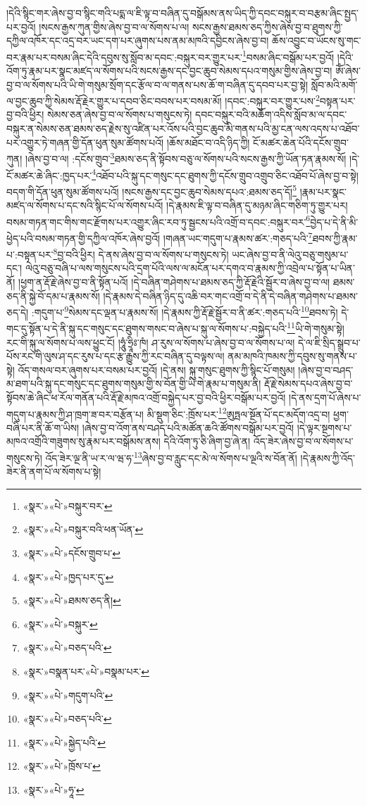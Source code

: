 །དེའི་སྙིང་གར་ཞེས་བྱ་བ་སྙིང་གའི་པདྨ་ལ་ཇི་ལྟ་བ་བཞིན་དུ་བསྒོམས་ནས་ཡིད་ཀྱི་དབང་བསྐུར་བ་བརྩམ་ཞིང་སྤྱད་པར་བྱའོ། །སངས་རྒྱས་ཀུན་གྱིས་ཞེས་བྱ་བ་ལ་སོགས་པ་ལ། སངས་རྒྱས་ཐམས་ཅད་ཀྱིས་ཞེས་བྱ་བ་ཐུགས་ཀྱི་དཀྱིལ་འཁོར་དང་འདྲ་བར་ཡང་དག་པར་ཞུགས་པས་ནམ་མཁའི་དབྱིངས་ཞེས་བྱ་བ། ཆོས་འབྱུང་བ་ཡོངས་སུ་གང་བར་རྣམ་པར་བསམ་ཞིང་དེའི་དབུས་སུ་སློབ་མ་དབང་:བསྐུར་བར་གྱུར་པར་\footnote{«སྣར་»«པེ་»བསྐུར་བར་}བསམ་ཞིང་བསྒོམ་པར་བྱའོ། །དེའི་འོག་ཏུ་རྣམ་པར་སྣང་མཛད་ལ་སོགས་པའི་སངས་རྒྱས་དང་བྱང་ཆུབ་སེམས་དཔའ་གསུམ་གྱིས་ཞེས་བྱ་བ། ཨོཾ་ཞེས་བྱ་བ་ལ་སོགས་པའི་ཡི་གེ་གསུམ་སྲོག་དང་རྩོལ་བ་ལ་གནས་པས་ཆོ་ག་བཞིན་དུ་དབབ་པར་བྱ་སྟེ། སློབ་མའི་མགོ་ལ་བྱང་ཆུབ་ཀྱི་སེམས་རྡོ་རྗེར་གྱུར་པ་དབབ་ཅིང་བབས་པར་བསམ་མོ། །དབང་:བསྐུར་བར་གྱུར་པས་\footnote{«སྣར་»«པེ་»བསྐུར་བའི་ཕན་ཡོན་}བསྟན་པར་བྱ་བའི་ཕྱིར། སེམས་ཅན་ཞེས་བྱ་བ་ལ་སོགས་པ་གསུངས་ཏེ། དབང་བསྐུར་བའི་མཆོག་འདིས་སློབ་མ་ལ་དབང་བསྐུར་ན་སེམས་ཅན་ཐམས་ཅད་རྗེས་སུ་འཛིན་པར་འོས་པའི་བྱང་ཆུབ་མི་གནས་པའི་མྱ་ངན་ལས་འདས་པ་འཐོབ་པར་འགྱུར་ཏེ་གཞན་གྱི་དོན་ཕུན་སུམ་ཚོགས་པའོ། །ཆོས་མཐོང་བ་འདི་ཉིད་ཀྱི། ངོ་མཚར་ཆེན་པོའི་དངོས་གྲུབ་ཀུན། །ཞེས་བྱ་བ་ལ། :དངོས་གྲུབ་\footnote{«སྣར་»«པེ་»དངོས་གྲུབ་པ་}ཐམས་ཅད་ནི་སྟོབས་བཅུ་ལ་སོགས་པའི་སངས་རྒྱས་ཀྱི་ཡོན་ཏན་རྣམས་སོ། །དེ་ངོ་མཚར་ཆེ་ཞིང་:ཁྱད་པར་\footnote{«སྣར་»«པེ་»ཁྱད་པར་དུ་}འཐོབ་པའི་སྐུ་དང་གསུང་དང་ཐུགས་ཀྱི་དངོས་གྲུབ་འགྲུབ་ཅིང་འཐོབ་པོ་ཞེས་བྱ་བ་སྟེ། བདག་གི་དོན་ཕུན་སུམ་ཚོགས་པའོ། །སངས་རྒྱས་དང་བྱང་ཆུབ་སེམས་དཔའ་:ཐམས་ཅད་དོ།\footnote{«སྣར་»«པེ་»ཐམས་ཅད་ནི།} །རྣམ་པར་སྣང་མཛད་ལ་སོགས་པ་དང་སའི་སྙིང་པོ་ལ་སོགས་པའོ། །དེ་རྣམས་ཇི་ལྟ་བ་བཞིན་དུ་མཉམ་ཞིང་གཅིག་ཏུ་གྱུར་པར། བསམ་གཏན་གང་གིས་གང་རྫོགས་པར་འགྱུར་ཞིང་རབ་ཏུ་སྦྱངས་པའི་འགྲོ་བ་དབང་:བསྐུར་བར་\footnote{«སྣར་»«པེ་»བསྐུར་}བྱེད་པ་དེ་ནི་མི་ཕྱེད་པའི་བསམ་གཏན་གྱི་དཀྱིལ་འཁོར་ཞེས་བྱའོ། །གཞན་ཡང་གདུག་པ་རྣམས་ཚར་:གཅད་པའི་\footnote{«སྣར་»«པེ་»བཅད་པའི་}ཐབས་ཀྱི་རྣམ་པ་:བསྟན་པར་\footnote{«སྣར་»བསྣན་པར་«པེ་»བསྣམ་པར་}བྱ་བའི་ཕྱིར། དེ་ནས་ཞེས་བྱ་བ་ལ་སོགས་པ་གསུངས་ཏེ། ཡང་ཞེས་བྱ་བ་ནི་ལེའུ་བཅུ་གསུམ་པ་དང་། ལེའུ་བཅུ་བཞི་པ་ལས་གསུངས་པའི་དྲག་པོའི་ལས་ལ་མངོན་པར་དགའ་བ་རྣམས་ཀྱི་འབྲེལ་པ་སྟོན་པ་ཡིན་ནོ། །ཕྱག་ན་རྡོ་རྗེ་ཞེས་བྱ་བ་ནི་སྟོན་པའོ། །དེ་བཞིན་གཤེགས་པ་ཐམས་ཅད་ཀྱི་རྡོ་རྗེའི་སྦྱོར་བ་ཞེས་བྱ་བ་ལ། ཐམས་ཅད་ནི་སྐྱེ་བོ་དམ་པ་རྣམས་སོ། །དེ་རྣམས་དེ་བཞིན་ཉིད་དུ་འཆི་བར་གང་འགྲོ་བ་དེ་ནི་དེ་བཞིན་གཤེགས་པ་ཐམས་ཅད་དེ། :གདུག་པ་\footnote{«སྣར་»«པེ་»གདུག་པའི་}སེམས་དང་ལྡན་པ་རྣམས་སོ། །དེ་རྣམས་ཀྱི་རྡོ་རྗེ་སྦྱོར་བ་ནི་ཚར་:གཅད་པའི་\footnote{«སྣར་»«པེ་»བཅད་པའི་}ཐབས་ཏེ། དེ་གང་དུ་སྟོན་པ་དེ་ནི་སྐུ་དང་གསུང་དང་ཐུགས་གསང་བ་ཞེས་པ་སྐུ་ལ་སོགས་པ་:བསྐྱེད་པའི་\footnote{«སྣར་»«པེ་»སྐྱེད་པའི་}ཡི་གེ་གསུམ་སྟེ། རང་གི་སྐུ་ལ་སོགས་པ་ལས་ཕྱུང་ངོ། །ཧཱུཾ་ཧྲཱིཿ་ཁཾ། ཤ་རུས་ལ་སོགས་པ་ཞེས་བྱ་བ་ལ་སོགས་པ་ལ། དེ་ལ་ཇི་སྲིད་སྒྲུབ་པ་པོས་རང་གི་ལུས་ཤ་དང་རུས་པ་དང་རྩ་རྒྱུས་ཀྱི་རང་བཞིན་དུ་བལྟས་ལ། ནམ་མཁའི་ཁམས་ཀྱི་དབུས་སུ་གནས་པ་སྟེ། འོད་གསལ་བར་ཞུགས་པར་བསམ་པར་བྱའོ། །དེ་ནས། སྐུ་གསུང་ཐུགས་ཀྱི་སྙིང་པོ་གསུམ། །ཞེས་བྱ་བ་བཤད་མ་ཐག་པའི་སྐུ་དང་གསུང་དང་ཐུགས་གསུམ་གྱི་ས་བོན་གྱི་ཡི་གེ་རྣམ་པ་གསུམ་ནི། རྡོ་རྗེ་སེམས་དཔའ་ཞེས་བྱ་བ་སྟོབས་ཆེ་ཞིང་ཕ་རོལ་གནོན་པའི་རྡོ་རྗེ་མཁའ་འགྲོ་བསྐྱེད་པར་བྱ་བའི་ཕྱིར་བསྒོམ་པར་བྱའོ། །དེ་ནས་དྲག་པོ་ཞེས་པ་གདུག་པ་རྣམས་ཀྱི་ཤ་ཁྲག་ཟ་བར་བརྩོན་པ། མི་སྡུག་ཅིང་:ཁྲོས་པར་\footnote{«སྣར་»«པེ་»ཁྲོས་པ་}ཨུཏྤལ་སྔོན་པོ་དང་མདོག་འདྲ་བ། ཕྱག་བཞི་པར་ནི་ཆོ་ག་ཡིས། །ཞེས་བྱ་བ་འོག་ནས་བཤད་པའི་མཚོན་ཆའི་ཚོགས་བསྒོམ་པར་བྱའོ། །དེ་ལྟར་སྔགས་པ་མཁའ་འགྲོའི་གཟུགས་སུ་རྣམ་པར་བསྒོམས་ནས། དེའི་འོག་ཏུ་ཅི་ཞིག་བྱ་ཞེ་ན། འོད་ཟེར་ཞེས་བྱ་བ་ལ་སོགས་པ་གསུངས་ཏེ། འོད་ཟེར་ལྔ་ནི་ཡ་ར་ལ་ཝ་ཧ་\footnote{«སྣར་»«པེ་»ཧཱ་}ཞེས་བྱ་བ་རླུང་དང་མེ་ལ་སོགས་པ་ལྔའི་ས་བོན་ནོ། །དེ་རྣམས་ཀྱི་འོད་ཟེར་ནི་ནག་པོ་ལ་སོགས་པ་སྟེ། 